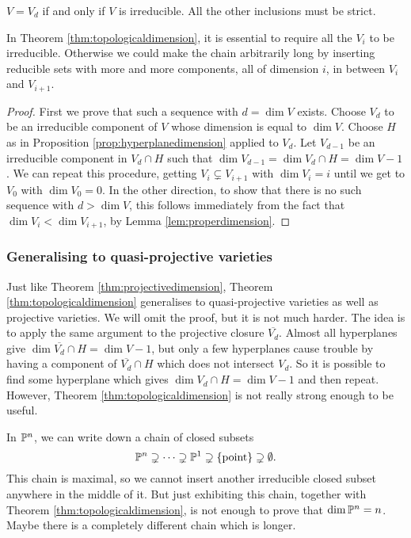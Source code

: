 \begin{note*}
$ V = V_d $ if and only if $ V $ is irreducible. All the other inclusions must be strict.
\end{note*}

In Theorem \ref{thm:topologicaldimension}, it is essential to require all the $ V_i $ to be irreducible. Otherwise we could make the chain arbitrarily long by inserting reducible sets with more and more components, all of dimension $ i $, in between $ V_i $ and $ V_{i + 1} $.

\begin{proof}
First we prove that such a sequence with $ d = \dim V $ exists. Choose $ V_d $ to be an irreducible component of $ V $ whose dimension is equal to $ \dim V $. Choose $ H $ as in Proposition \ref{prop:hyperplanedimension} applied to $ V_d $. Let $ V_{d - 1} $ be an irreducible component in $ V_d \cap H $ such that $ \dim V_{d - 1} = \dim V_d \cap H = \dim V - 1 $. We can repeat this procedure, getting $ V_i \subsetneq V_{i + 1} $ with $ \dim V_i = i $ until we get to $ V_0 $ with $ \dim V_0 = 0 $. In the other direction, to show that there is no such sequence with $ d > \dim V $, this follows immediately from the fact that $ \dim V_i < \dim V_{i + 1} $, by Lemma \ref{lem:properdimension}.
\end{proof}

\subsubsection{Generalising to quasi-projective varieties}

Just like Theorem \ref{thm:projectivedimension}, Theorem \ref{thm:topologicaldimension} generalises to quasi-projective varieties as well as projective varieties. We will omit the proof, but it is not much harder. The idea is to apply the same argument to the projective closure $ \overline{V_d} $. Almost all hyperplanes give $ \dim \overline{V_d} \cap H = \dim V - 1 $, but only a few hyperplanes cause trouble by having a component of $ \overline{V_d} \cap H $ which does not intersect $ V_d $. So it is possible to find some hyperplane which gives $ \dim V_d \cap H = \dim V - 1 $ and then repeat. However, Theorem \ref{thm:topologicaldimension} is not really strong enough to be useful.

\begin{example*}
In $ \mathbb{P}^n $, we can write down a chain of closed subsets
$$ \PP^n \supsetneq \dots \supsetneq \PP^1 \supsetneq \cbr{\text{point}} \supsetneq \emptyset. $$
This chain is maximal, so we cannot insert another irreducible closed subset anywhere in the middle of it. But just exhibiting this chain, together with Theorem \ref{thm:topologicaldimension}, is not enough to prove that $ \dim \mathbb{P}^n = n $. Maybe there is a completely different chain which is longer.
\end{example*}

